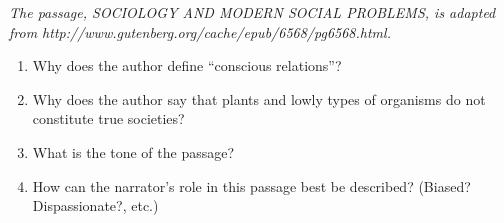 \textit{The passage, SOCIOLOGY AND MODERN SOCIAL PROBLEMS, is adapted from http://www.gutenberg.org/cache/epub/6568/pg6568.html.}

\bigskip
\begin{spacing}{1.5}
\begin{enumerate}

\item Why does the author define ``conscious relations''? \hrulefill

\item Why does the author say that plants and lowly types of organisms do not constitute true societies? \hrulefill

\item What is the tone of the passage? \hrulefill

\item How can the narrator's role in this passage best be described? (Biased? Dispassionate?, etc.) \hrulefill
\end{enumerate}
\end{spacing}